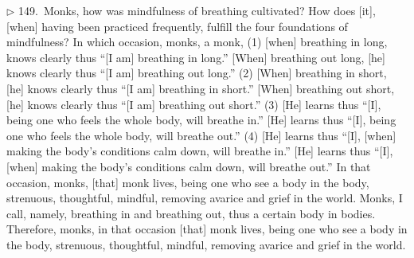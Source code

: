 \addtocounter{sennum}{-4}
$\triangleright$  149.\ Monks, how was mindfulness of breathing cultivated? How does [it], [when] having been practiced frequently, fulfill the four foundations of mindfulness?  In which occasion, monks, a monk, (1) [when] breathing in long, knows clearly thus ``[I am] breathing in long.'' [When] breathing out long, [he] knows clearly thus ``[I am] breathing out long.'' (2) [When] breathing in short, [he] knows clearly thus ``[I am] breathing in short.'' [When] breathing out short, [he] knows clearly thus ``[I am] breathing out short.'' (3) [He] learns thus ``[I], being one who feels the whole body, will breathe in.'' [He] learns thus ``[I], being one who feels the whole body, will breathe out.'' (4) [He] learns thus ``[I], [when] making the body's conditions calm down, will breathe in.'' [He] learns thus ``[I], [when] making the body's conditions calm down, will breathe out.''  In that occasion, monks, [that] monk lives, being one who see a body in the body, strenuous, thoughtful, mindful, removing avarice and grief in the world.  Monks, I call, namely, breathing in and breathing out, thus a certain body in bodies. Therefore, monks, in that occasion [that] monk lives, being one who see a body in the body, strenuous, thoughtful, mindful, removing avarice and grief in the world.\\


